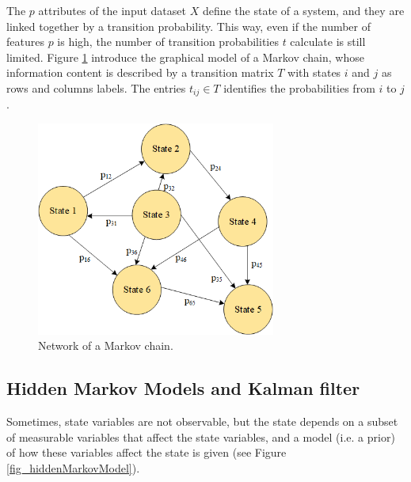 The $p$ attributes of the input dataset $X$ define the state of a system, and they are linked together by a transition probability. This way, even if the number of features $p$ is high, the number of transition probabilities $t$ calculate is still limited. Figure \ref{fig_markovChain} introduce the graphical model of a Markov chain, whose information content is described by a transition matrix $T$ with states $i$ and $j$ as rows and columns labels. The entries $t_{ij}\in T$ identifies the probabilities from $i$ to $j$.

\begin{figure}[hbt!]
\centering
\includegraphics[width=0.7\textwidth]{SectionLetsMath/nonLinearMethods_fig/fig_markovChain.png}
\captionsetup{type=figure}
\caption{Network of a Markov chain.}
\label{fig_markovChain}
\end{figure}

\subsection{Hidden Markov Models and Kalman filter} \label{secKalmanFilter}
Sometimes, state variables are not observable, but the state depends on a subset of measurable variables that affect the state variables, and a model (i.e. a prior) of how these variables affect the state is given (see Figure \ref{fig_hiddenMarkovModel}).

